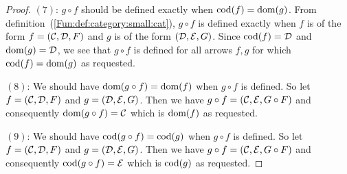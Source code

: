 \begin{proof}
    $(7)$: $g\circ f$ should be defined exactly when $\mbox{\rm cod}(f)=\mbox{\rm dom}(g)$. From
    definition~(\ref{Fun:def:category:small:cat}), $g\circ f$ is defined 
    exactly when $f$ is of the form $f=(\mbox{$\cal C$},\mbox{$\cal D$},F)$ and $g$ is of the form
    $(\mbox{$\cal D$},\mbox{$\cal E$},G)$. Since $\mbox{\rm cod}(f)=\mbox{$\cal D$}$ and $\mbox{\rm dom}(g)=\mbox{$\cal D$}$, we see that
    $g\circ f$ is defined for all arrows $f,g$ for which $\mbox{\rm cod}(f)=\mbox{\rm dom}(g)$ 
    as requested.

    $(8)$: We should have $\mbox{\rm dom}(g\circ f) = \mbox{\rm dom}(f)$ when $g\circ f$ is defined.
    So let $f=(\mbox{$\cal C$},\mbox{$\cal D$},F)$ and $g=(\mbox{$\cal D$},\mbox{$\cal E$},G)$. Then we have 
    $g\circ f=(\mbox{$\cal C$},\mbox{$\cal E$},G\circ F)$ and consequently $\mbox{\rm dom}(g\circ f)=\mbox{$\cal C$}$ which
    is $\mbox{\rm dom}(f)$ as requested.

    $(9)$: We should have $\mbox{\rm cod}(g\circ f) = \mbox{\rm cod}(g)$ when $g\circ f$ is defined.
    So let $f=(\mbox{$\cal C$},\mbox{$\cal D$},F)$ and $g=(\mbox{$\cal D$},\mbox{$\cal E$},G)$. Then we have 
    $g\circ f=(\mbox{$\cal C$},\mbox{$\cal E$},G\circ F)$ and consequently $\mbox{\rm cod}(g\circ f)=\mbox{$\cal E$}$ which
    is $\mbox{\rm cod}(g)$ as requested.


\end{proof}
